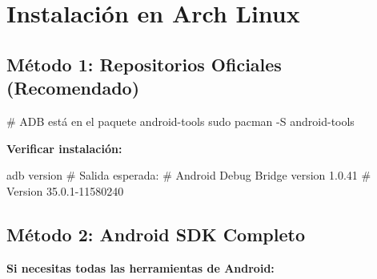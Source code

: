 \documentclass[
  doc,
  floatsintext,
  longtable,
  a4paper,
  nolmodern,
  notxfonts,
  notimes,
  12pt,
  colorlinks=true,linkcolor=blue,citecolor=blue,urlcolor=blue]{apa7}
\newenvironment{Shaded}{\begin{snugshade}}{\end{snugshade}}
\newcommand{\AttributeTok}[1]{\textcolor[rgb]{0.40,0.45,0.13}{#1}}
\newcommand{\BuiltInTok}[1]{\textcolor[rgb]{0.00,0.23,0.31}{#1}}
\newcommand{\CommentTok}[1]{\textcolor[rgb]{0.37,0.37,0.37}{#1}}
\newcommand{\ExtensionTok}[1]{\textcolor[rgb]{0.00,0.23,0.31}{#1}}
\newcommand{\FunctionTok}[1]{\textcolor[rgb]{0.28,0.35,0.67}{#1}}
\newcommand{\NormalTok}[1]{\textcolor[rgb]{0.00,0.23,0.31}{#1}}
\newcommand{\VariableTok}[1]{\textcolor[rgb]{0.07,0.07,0.07}{#1}}
\begin{document}
\section{Instalación en Arch Linux}\label{instalaciuxf3n-en-arch-linux}

\subsection{Método 1: Repositorios Oficiales
(Recomendado)}\label{muxe9todo-1-repositorios-oficiales-recomendado}

\begin{Shaded}
\begin{Highlighting}[]
\CommentTok{\# ADB está en el paquete android{-}tools}
\FunctionTok{sudo}\NormalTok{ pacman }\AttributeTok{{-}S}\NormalTok{ android{-}tools}
\end{Highlighting}
\end{Shaded}

\textbf{Verificar instalación:}

\begin{Shaded}
\begin{Highlighting}[]
\ExtensionTok{adb}\NormalTok{ version}
\CommentTok{\# Salida esperada:}
\CommentTok{\# Android Debug Bridge version 1.0.41}
\CommentTok{\# Version 35.0.1{-}11580240}
\end{Highlighting}
\end{Shaded}

\subsection{Método 2: Android SDK
Completo}\label{muxe9todo-2-android-sdk-completo}

\textbf{Si necesitas todas las herramientas de Android:}

\begin{Shaded}
\end{Shaded}
\end{document}
